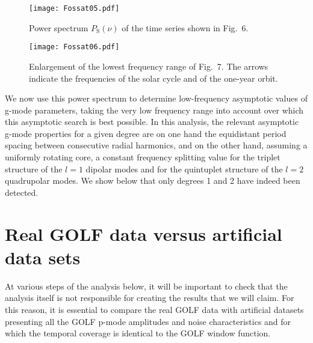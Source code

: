 \documentclass[bibyear]{aa}
\begin{document}
\begin{figure}
\centering
\texttt{[image: Fossat05.pdf]}
\caption{Power spectrum $P_\mathrm{S}(\nu)$ of the time series shown in Fig.~6.  }
\label{fig:PS}
\end{figure} 


\begin{figure}
\centering
\texttt{[image: Fossat06.pdf]}
\caption{Enlargement of the lowest frequency range of Fig.~7. The arrows indicate the frequencies of the solar cycle and of the one-year orbit.  }
\label{fig:PS_zoom}
\end{figure} 

We now use this power spectrum  to determine low-frequency asymptotic values of g-mode parameters, taking the very low frequency range into account over which this asymptotic search is best possible.    In this analysis, the relevant asymptotic g-mode properties for a given degree are on one hand the equidistant period spacing between consecutive radial harmonics, and on the other hand, assuming a uniformly rotating core, a constant frequency splitting value for the triplet structure of the $l=1$ dipolar modes and for the quintuplet structure of the $l=2$ quadrupolar modes. We show below that only degrees 1 and 2 have indeed been detected.





\section{Real GOLF data versus artificial data sets}


At various steps of the analysis below, it will be important to check that the analysis itself is not responsible for creating the results that we will claim. For this reason, it is essential to compare the real GOLF data with artificial datasets presenting all the GOLF p-mode amplitudes and noise characteristics and for which the temporal coverage is identical to the GOLF window function.  
\end{document}

